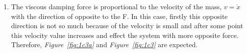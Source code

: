 \documentclass[a4paper,12pt]{article}
\begin{document}
\begin{enumerate}
\begin{enumerate}
\begin{enumerate}
			
			\item  The viscous damping force is proportional to the velocity of the mass, $v=\dot{x}$ with the direction of opposite to the F. In this case, firstly this opposite direction is not so much because of the velocity is small and after some point this velocity value increases and effect the system with more opposite force. Therefore, \textit{Figure~\ref{fig:1c3a}} and \textit{Figure~\ref{fig:1c3}} are expected.
			

\end{enumerate}
\end{enumerate}
\end{enumerate}
\end{document}
